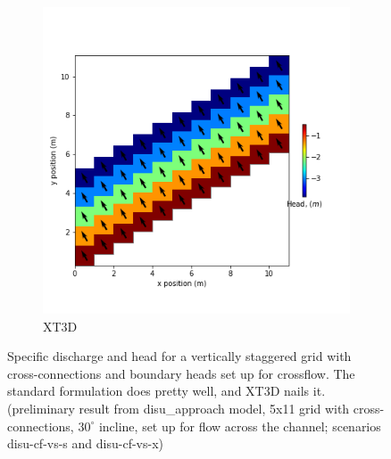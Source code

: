 \documentclass{article}
\begin{document}
\begin{figure}[H]
\begin{subfigure}{0.4\textwidth}
	\includegraphics[width=\textwidth]{../figures/disu-cf-vs-x-head.png}
	\caption{XT3D}
	\label{fig:disu-x-cc-cf-head}
\end{subfigure}
\caption{Specific discharge and head for a vertically staggered grid with cross-connections and boundary heads set up for crossflow. The standard formulation does pretty well, and XT3D nails it. (preliminary result from disu\_approach model, 5x11 grid with cross-connections, $30^{\circ}$ incline, set up for flow across the channel; scenarios disu-cf-vs-s and disu-cf-vs-x)}
\label{fig:figures}
\end{figure}
\end{document}
